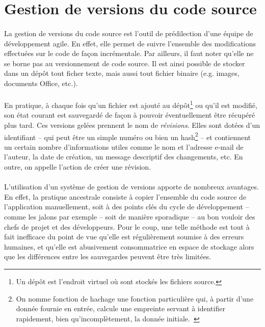 \section{Gestion de versions du code source}
\label{section:pic-source}

\paragraph{}
La gestion de versions du code source est l'outil de prédilection d'une équipe de développement agile.
En effet, elle permet de suivre l'ensemble des modifications effectuées sur le code de façon incrémentale.
Par ailleurs, il faut noter qu'elle ne se borne pas au versionnement de code source.
Il est ainsi possible de stocker dans un dépôt tout ficher texte, mais aussi tout fichier binaire (e.g. images, documents Office, etc.).

\paragraph{}
En pratique, à chaque fois qu'un fichier est ajouté au dépôt\footnote{Un dépôt est l'endroit virtuel où sont stockés les fichiers source.} ou qu'il est modifié, son état courant est sauvegardé de façon à pouvoir éventuellement être récupéré plus tard.
Ces versions gelées prennent le nom de \emph{révisions}.
Elles sont dotées d'un identifiant -- qui peut être un simple numéro ou bien un hash\footnote{On nomme fonction de hachage une fonction particulière qui, à partir d'une donnée fournie en entrée, calcule une empreinte servant à identifier rapidement, bien qu'incomplètement, la donnée initiale.~\cite{hash}} -- et contiennent un certain nombre d'informations utiles comme le nom et l'adresse e-mail de l'auteur, la date de création, un message descriptif des changements, etc.
En outre, on appelle \acommit{} l'action de créer une révision.

\paragraph{}
L'utilisation d'un système de gestion de versions apporte de nombreux avantages.
En effet, la pratique ancestrale consiste à copier l'ensemble du code source de l'application manuellement, soit à des points clés du cycle de développement -- comme les jalons par exemple -- soit de manière sporadique -- au bon vouloir des chefs de projet et des développeurs.
Pour le coup, une telle méthode est tout à fait inefficace du point de vue qu'elle est régulièrement soumise à des erreurs humaines, et qu'elle est abusivement consommatrice en espace de stockage alors que les différences entre les sauvegardes peuvent être très limitées.

